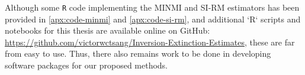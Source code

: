 Although some \texttt{R} code implementing the MINMI and SI-RM estimators has been provided in \autoref{apx:code-minmi} and \autoref{apx:code-si-rm}, and additional `R` scripts and notebooks for this thesis are available online on GitHub: \url{https://github.com/victorwctsang/Inversion-Extinction-Estimates}, these are far from easy to use. Thus, there also remains work to be done in developing software packages for our proposed methods.
